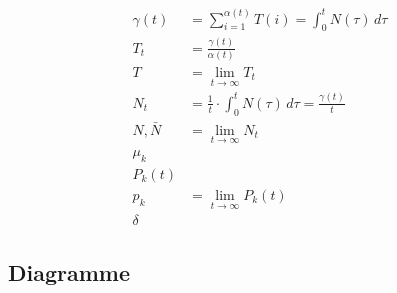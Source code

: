 \documentclass[a4paper, 11pt, accentcolor = tud3b]{tudreport}
\begin{document}
\begin{align*}
	        	\gamma(t)   & = \sum _ { i = 1 } ^ { \alpha(t) } T(i) = \int _ 0 ^ t \! N(\tau) \, d\tau \tag{Gesamte von Anfragen im System verbrachte Zeit}             \\
	        	T _ t       & =\frac{\gamma(t)}{\alpha(t)} \tag{Durchschnittliche Systemzeit pro Anfrage im Interval [0, t)}                                              \\
	        	T           & = \lim\limits _ {t \to \infty} T _ t \tag{Durchschnittliche Systemzeit pro Anfrage}                                                         \\
	        	N _ t       & = \frac{1}{t} \cdot \int _ 0 ^ t \! N(\tau) \, d\tau = \frac{\gamma(t)}{t} \tag{Durchschnittliche Anzahl Anfragen im Interval \( [0, t) \)} \\
	        	N, \bar{N}  & = \lim\limits _ {t \to \infty} N _ t \tag{Durchschnittliche Anzahl Anfragen}                                                                \\
	        	\mu _ k     & \tag{Durchschnittliche Abfertigungsrate pro Anfrage bei \(k\) Anfragen im System}                                                           \\
	        	P _ k (t)   & \tag{Wahrscheinlichkeit, dass sich zum Zeitpunkt \(t\) \(k\) Anfragen im System befinden}                                                   \\
	        	p _ k       & = \lim\limits _ { t \to \infty } P _ k (t) \tag{Wahrscheinlichkeit, dass sich \(k\) Anfragen im System befinden}                            \\
	        	\delta      & \tag{Wahrscheinlichkeit, dass sich Elemente in der Warteschlange befinden}
	        \end{align*}

            \subsection{Diagramme} %
\end{document}
